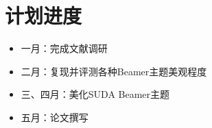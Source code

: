 \section{计划进度}
\begin{frame}
    \begin{itemize}
        \item 一月：完成文献调研
        \item 二月：复现并评测各种Beamer主题美观程度
        \item 三、四月：美化SUDA Beamer主题
        \item 五月：论文撰写
    \end{itemize}
\end{frame}